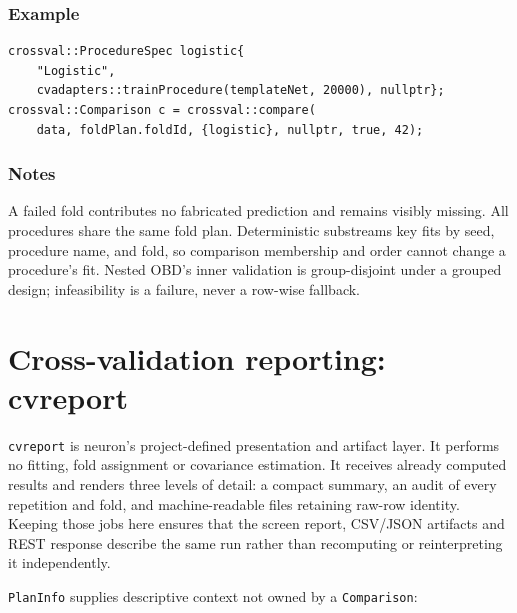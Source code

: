 \subsubsection{Example}
\begin{verbatim}
crossval::ProcedureSpec logistic{
    "Logistic",
    cvadapters::trainProcedure(templateNet, 20000), nullptr};
crossval::Comparison c = crossval::compare(
    data, foldPlan.foldId, {logistic}, nullptr, true, 42);
\end{verbatim}

\subsubsection{Notes}
A failed fold contributes no fabricated prediction and remains visibly missing.
All procedures share the same fold plan.  Deterministic substreams key fits by
seed, procedure name, and fold, so comparison membership and order cannot change
a procedure's fit.  Nested OBD's inner validation is group-disjoint under a
grouped design; infeasibility is a failure, never a row-wise fallback.

\section{Cross-validation reporting: cvreport}\label{cvreport_objects}

\texttt{cvreport} is neuron's project-defined presentation and artifact layer.
It performs no fitting, fold assignment or covariance estimation.  It receives
already computed results and renders three levels of detail: a compact summary,
an audit of every repetition and fold, and machine-readable files retaining
raw-row identity.  Keeping those jobs here ensures that the screen report,
CSV/JSON artifacts and REST response describe the same run rather than
recomputing or reinterpreting it independently.

\texttt{PlanInfo} supplies descriptive context not owned by a
\texttt{Comparison}:

